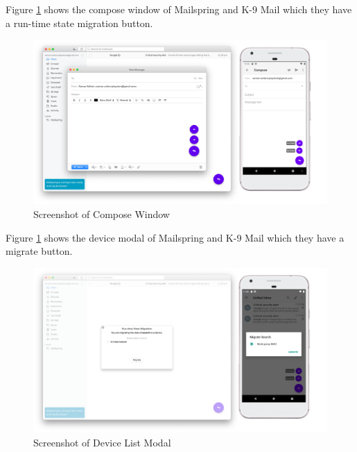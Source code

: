 Figure \ref{fig:adapt-compose} shows the compose window of Mailspring and K-9 Mail which they have a run-time state migration button.

\FloatBarrier
\begin{figure}[H]
    \includegraphics[width=\linewidth]{../figures/adapt-compose.png}
    \centering
    \caption{Screenshot of Compose Window}
    \label{fig:adapt-compose}
\end{figure}
\FloatBarrier

Figure \ref{fig:adapt-compose} shows the device modal of Mailspring and K-9 Mail which they have a migrate button.

\FloatBarrier
\begin{figure}[H]
    \includegraphics[width=\linewidth]{../figures/adapt-modal.png}
    \centering
    \caption{Screenshot of Device List Modal}
    \label{fig:adapt-modal}
\end{figure}
\FloatBarrier


